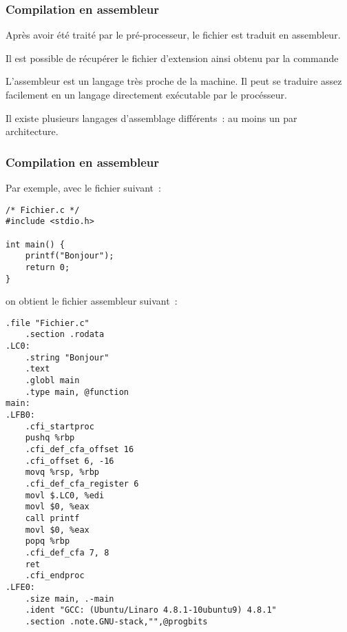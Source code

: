 \begin{frame}[fragile]
\frametitle{Compilation en assembleur}
Après avoir été traité par le pré-processeur, le fichier 
est \alert{traduit en assembleur}.
\medskip

Il est possible de récupérer le fichier d'extension  ainsi
obtenu par la commande
\begin{center}  \end{center}
\bigskip

L'assembleur est un langage très proche de la machine. Il peut se traduire
assez facilement en un langage directement exécutable par le procésseur.
\medskip

Il existe plusieurs langages d'assemblage différents~: au moins un par
architecture.
\end{frame}

\begin{frame}[fragile]
\frametitle{Compilation en assembleur}
Par exemple, avec le fichier  suivant~:

\begin{minipage}[c]{.4\textwidth}
\begin{lstlisting}[frame=single,numbers=none,basicstyle=\ttfamily\scriptsize]
/* Fichier.c */
#include <stdio.h>

int main() {
    printf("Bonjour");
    return 0;
}
\end{lstlisting}
\end{minipage}

on obtient le fichier assembleur  suivant~:
\begin{multicols}{3}
\begin{lstlisting}[language={[x86masm]Assembler},numbers=none,
    basicstyle=\ttfamily\scriptsize]
    .file "Fichier.c"
    .section .rodata
.LC0:
    .string	"Bonjour"
    .text
    .globl main
    .type main, @function
main:
.LFB0:
    .cfi_startproc
    pushq %rbp
    .cfi_def_cfa_offset 16
    .cfi_offset 6, -16
    movq %rsp, %rbp
    .cfi_def_cfa_register 6
    movl $.LC0, %edi
    movl $0, %eax
    call printf
    movl $0, %eax
    popq %rbp
    .cfi_def_cfa 7, 8
    ret
    .cfi_endproc
.LFE0:
    .size main, .-main
    .ident "GCC: (Ubuntu/Linaro 4.8.1-10ubuntu9) 4.8.1"
    .section .note.GNU-stack,"",@progbits

\end{lstlisting}
\end{multicols}
\begin{math} \end{math}
\end{frame}

